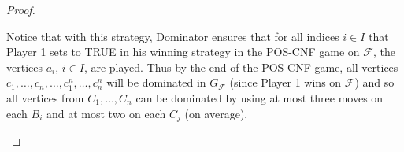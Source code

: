 \documentclass[10pt,a4paper]{amsart}
\newcommand{\F}{\mathcal{F}}
\begin{document}
\begin{proof}
\begin{enumerate}[(1)]
		
		
		Notice that with this strategy, Dominator ensures that for all indices $i \in I$ that Player 1 sets to TRUE in his winning strategy in the POS-CNF game on $\F$, the vertices $a_i$, $i \in I$, are played. Thus by the end of the POS-CNF game, all vertices $c_1, \ldots, c_n, \ldots, c_1^n, \ldots, c_n^n$ will be dominated in $G_\F$ (since Player 1 wins on $\F$) and so all vertices from $C_1, \ldots, C_n$ can be dominated by using at most three moves on each $B_i$ and at most two on each $C_j$ (on average).
		

\end{enumerate}
\end{proof}
\end{document}
